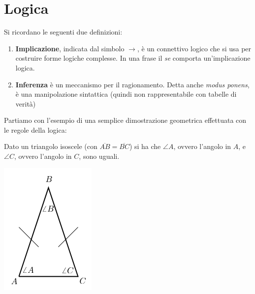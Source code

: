 \documentclass[a4paper,12pt, oneside]{book}
\begin{document}
\section{Logica}
Si ricordano le seguenti due definizioni:
\begin{enumerate}
\item \textbf{Implicazione}, indicata dal simbolo $\to$, è un connettivo logico che si usa per costruire forme logiche complesse. In una frase il \textit{se} comporta un'implicazione logica.
\item \textbf{Inferenza} è un meccanismo per il ragionamento. Detta anche \textit{modus ponens}, è una manipolazione sintattica (quindi non rappresentabile con tabelle di verità)
\end{enumerate}
Partiamo con l'esempio di una semplice dimostrazione geometrica effettuata con le regole della logica:
\begin{teorema}
Dato un triangolo isoscele (con $\overline{AB}=\overline{BC}$) si ha che $\angle A$, ovvero l'angolo in $A$, e $\angle C$, ovvero l'angolo in $C$, sono uguali.
\begin{center}
\includegraphics[scale=0.5]{img/tri.png}
\end{center}
\end{teorema}
\end{document}
